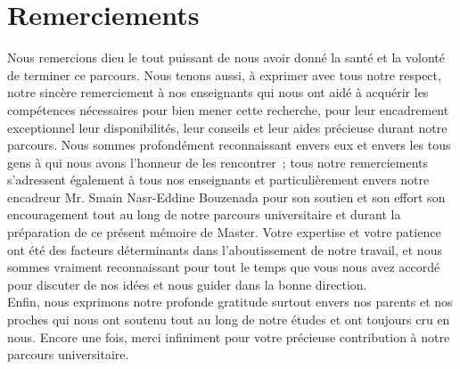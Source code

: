 \chapter*{Remerciements}

Nous remercions dieu le tout puissant de nous avoir donné la santé et la volonté de terminer ce parcours. Nous tenons aussi, à exprimer avec tous notre respect, notre sincère remerciement à nos enseignants qui nous ont aidé à acquérir les compétences nécessaires pour bien mener cette recherche,  pour leur encadrement exceptionnel leur disponibilités, leur conseils et leur aides précieuse durant notre parcours. Nous sommes profondément reconnaissant envers eux et envers les tous gens à qui nous avons l’honneur de les rencontrer ; tous notre remerciements s’adressent également à tous nos enseignants et particulièrement envers notre encadreur Mr. Smain Nasr-Eddine Bouzenada pour son soutien et son effort son encouragement tout au long de notre parcours universitaire et durant la préparation de ce présent mémoire de Master. Votre expertise et votre patience ont été des facteurs déterminants dans l’aboutissement
de notre travail, et nous sommes vraiment reconnaissant pour tout le temps que vous nous avez accordé pour discuter de nos idées et nous guider dans la bonne direction.
\\
Enfin, nous exprimons notre profonde gratitude surtout envers nos parents et nos proches qui nous ont soutenu tout au long de notre études et ont toujours cru en nous. Encore une fois, merci infiniment pour votre précieuse contribution à notre parcours universitaire.


